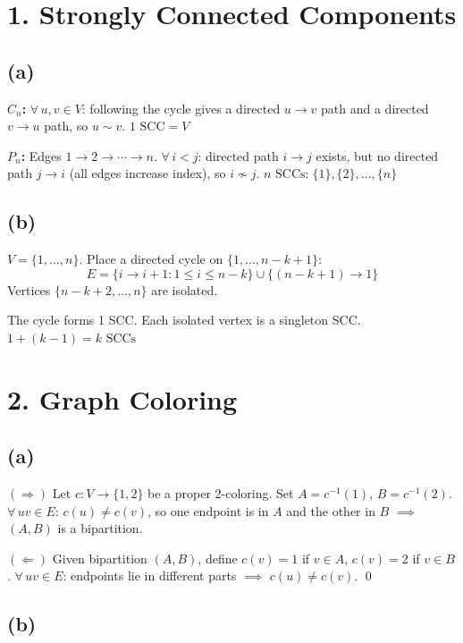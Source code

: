 \documentclass[11pt]{article}
\begin{document}
\section*{1. Strongly Connected Components}

\subsection*{(a)}

\textbf{$C_n$:} $\forall\, u, v \in V$: following the cycle gives a directed $u \to v$ path and a directed $v \to u$ path, so $u \sim v$. $\boxed{1 \text{ SCC} = V}$

\textbf{$P_n$:} Edges $1 \to 2 \to \cdots \to n$. $\forall\, i < j$: directed path $i \to j$ exists, but no directed path $j \to i$ (all edges increase index), so $i \not\sim j$. $\boxed{n \text{ SCCs:}\;\{1\},\{2\},\ldots,\{n\}}$

\subsection*{(b)}

$V = \{1, \ldots, n\}$. Place a directed cycle on $\{1, \ldots, n-k+1\}$:
\[
E = \{i \to i{+}1 : 1 \le i \le n{-}k\} \cup \{(n{-}k{+}1) \to 1\}
\]
Vertices $\{n{-}k{+}2, \ldots, n\}$ are isolated.

The cycle forms 1 SCC. Each isolated vertex is a singleton SCC. $\boxed{1 + (k-1) = k \text{ SCCs}}$


\section*{2. Graph Coloring}

\subsection*{(a)}

$(\Rightarrow)$ Let $c : V \to \{1,2\}$ be a proper 2-coloring. Set $A = c^{-1}(1)$, $B = c^{-1}(2)$. $\forall\, uv \in E$: $c(u) \ne c(v)$, so one endpoint is in $A$ and the other in $B$ $\implies$ $(A,B)$ is a bipartition.

$(\Leftarrow)$ Given bipartition $(A,B)$, define $c(v) = 1$ if $v \in A$, $c(v) = 2$ if $v \in B$. $\forall\, uv \in E$: endpoints lie in different parts $\implies$ $c(u) \ne c(v)$. \qed

\subsection*{(b)}
\end{document}
